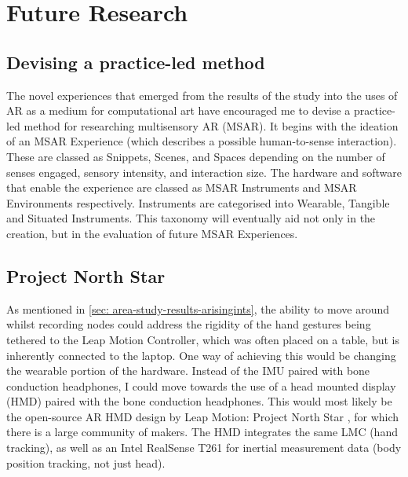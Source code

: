 \section{Future Research}                       \label{sec: area-future}

\subsection{Devising a practice-led method}     \label{sec: area-future-method}
The  novel experiences that emerged from the results of the study into the uses of AR as a medium for computational art have encouraged me to devise a practice-led method for researching multisensory AR (MSAR). It begins with the ideation of an MSAR Experience (which describes a possible human-to-sense interaction). These are classed as Snippets, Scenes, and Spaces depending on the number of senses engaged, sensory intensity, and interaction size. The hardware and software that enable the experience are classed as MSAR Instruments and MSAR Environments respectively. Instruments are categorised into Wearable, Tangible and Situated Instruments. This taxonomy will eventually aid not only in the creation, but in the evaluation of future MSAR Experiences. 

\subsection{Project North Star}                 \label{sec: area-future-pns}
As mentioned in \autoref{sec: area-study-results-arisingints}, the ability to move around whilst recording nodes could address the rigidity of the hand gestures being tethered to the Leap Motion Controller, which was often placed on a table, but is inherently connected to the laptop. One way of achieving this would be changing the wearable portion of the hardware. Instead of the IMU paired with bone conduction headphones, I could move towards the use of a head mounted display (HMD) paired with the bone conduction headphones. This would most likely be the open-source AR HMD design by Leap Motion: Project North Star \citeyearpar{leapmotion2018}, for which there is a large community of makers. The HMD integrates the same LMC (hand tracking), as well as an Intel RealSense T261 for inertial measurement data (body position tracking, not just head). 

